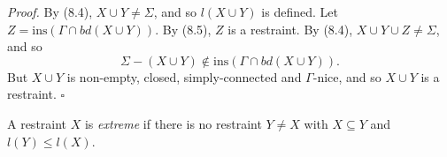 \textit{Proof.} By (8.4), $X \cup Y \ne \Sigma$, and so $l(X \cup Y)$ is defined. Let $Z = \mathrm{ins}(\Gamma \cap bd(X \cup Y))$. By (8.5), $Z$ is a restraint. By (8.4), $X \cup Y \cup Z \ne \Sigma$, and so
\begin{equation*}
\Sigma - (X \cup Y) \notin \mathrm{ins}(\Gamma \cap bd(X \cup Y)).
\end{equation*}
But $X \cup Y$ is non-empty, closed, simply-connected and $\Gamma$-nice, and so $X \cup Y$ is a restraint. $\square$

A restraint $X$ is \textit{extreme} if there is no restraint $Y \ne X$ with $X \subseteq Y$ and $l(Y) \le l(X)$.
